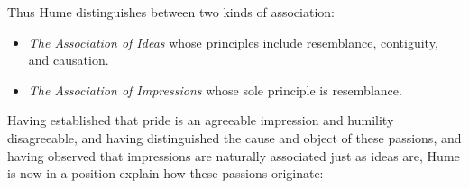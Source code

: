 Thus Hume distinguishes between two kinds of association:

\begin{itemize}
    \item \emph{The Association of Ideas} whose principles include resemblance, contiguity, and causation.
    \item \emph{The Association of Impressions} whose sole principle is resemblance.
\end{itemize}

\change

% 


Having established that pride is an agreeable impression and humility disagreeable, and having distinguished the cause and object of these passions, and having observed that impressions are naturally associated just as ideas are, Hume is now in a position explain how these passions originate:

